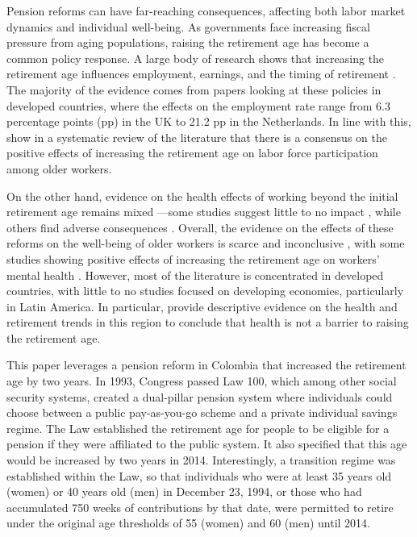\documentclass[12pt, a4paper]{article}
\begin{document}
Pension reforms can have far-reaching consequences, affecting both labor market dynamics and individual well-being. As governments face increasing fiscal pressure from aging populations, raising the retirement age has become a common policy response. A large body of research shows that increasing the retirement age influences employment, earnings, and the timing of retirement \citep{geyer2020labor,hernaes2016pension,sanchez2014delaying,cribb2016signals,de2018social,geyer2021closing,rabate2020employment,atalay2015impact,staubli2013does,rabate2024increasing}. The majority of the evidence comes from papers looking at these policies in developed countries, where the effects on the employment rate range from 6.3 percentage points (pp) in the UK to 21.2 pp in the Netherlands. In line with this, \citet{pilipiec2021effect} show in a systematic review of the literature that there is a consensus on the positive effects of increasing the retirement age on labor force participation among older workers.

On the other hand, evidence on the health effects of working beyond the initial retirement age remains mixed —some studies suggest little to no impact \citep{hagen2018effects}, while others find adverse consequences \citep{coe2011retirement}. Overall, the evidence on the effects of these reforms on the well-being of older workers is scarce and inconclusive \citep{pilipiec2021effect}, with some studies showing positive effects of increasing the retirement age on workers' mental health \citep{maimaris2010impact}. However, most of the literature is concentrated in developed countries, with little to no studies focused on developing economies, particularly in Latin America. In particular, \citet{de2019trends} provide descriptive evidence on the health and retirement trends in this region to conclude that health is not a barrier to raising the retirement age. 

This paper leverages a pension reform in Colombia that increased the retirement age by two years. In 1993, Congress passed Law 100, which among other social security systems, created a dual-pillar pension system where individuals could choose between a public pay-as-you-go scheme and a private individual savings regime. The Law established the retirement age for people to be eligible for a pension if they were affiliated to the public system. It also specified that this age would be increased by two years in 2014. Interestingly, a transition regime was established within the Law, so that individuals who were at least 35 years old (women) or 40 years old (men) in December 23, 1994, or those who had accumulated 750 weeks of contributions by that date, were permitted to retire under the original age thresholds of 55 (women) and 60 (men) until 2014.
\end{document}
